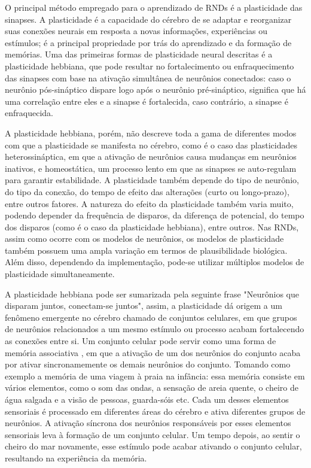 O principal método empregado para o aprendizado de RNDs é a plasticidade das sinapses. A plasticidade é a capacidade do cérebro de
se adaptar e reorganizar suas conexões neurais em resposta a novas informações, experiências ou estímulos; é a principal
propriedade por trás do aprendizado e da formação de memórias. Uma das primeiras formas de plasticidade neural descritas é a
plasticidade hebbiana, que pode resultar no fortalecimento ou enfraquecimento das sinapses com base na ativação simultânea de
neurônios conectados: caso o neurônio pós-sináptico dispare logo após o neurônio pré-sináptico, significa que há uma correlação
entre eles e a sinapse é fortalecida, caso contrário, a sinapse é enfraquecida.

A plasticidade hebbiana, porém, não descreve toda a gama de diferentes modos com que a plasticidade se manifesta no cérebro, como
é o caso das  plasticidades heterossináptica, em que a ativação de neurônios causa mudanças em neurônios inativos, e homeostática,
um processo lento em que as sinapses se auto-regulam para garantir estabilidade. A plasticidade também
depende do tipo de neurônio, do tipo da conexão, do tempo de efeito das alterações (curto ou longo-prazo), entre outros fatores. A
natureza do efeito da plasticidade também varia muito, podendo depender da frequência de disparos, da diferença de potencial, do
tempo dos disparos (como é o caso da plasticidade hebbiana), entre outros. Nas RNDs, assim como ocorre com os modelos de
neurônios, os modelos de plasticidade também possuem uma ampla variação em termos de plausibilidade biológica. Além disso,
dependendo da implementação, pode-se utilizar múltiplos modelos de plasticidade simultaneamente.

A plasticidade hebbiana pode ser sumarizada pela seguinte frase "Neurônios que disparam juntos, conectam-se juntos", assim, a
plasticidade dá origem a um fenômeno emergente no cérebro chamado de conjuntos celulares, em que grupos de neurônios relacionados
a um mesmo estímulo ou processo acabam fortalecendo as conexões entre si. Um conjunto celular pode servir como uma forma de
memória associativa \cite{sakuraiMultipleApproachesInvestigation2018}, em que a ativação de um dos neurônios do conjunto acaba por
ativar sincronamemente os demais neurônios do conjunto. Tomando como exemplo a memória de uma viagem à praia na infância: essa
memória consiste em vários elementos, como o som das ondas, a sensação de areia quente, o cheiro de água salgada e a visão de
pessoas, guarda-sóis etc. Cada um desses elementos sensoriais é processado em diferentes áreas do cérebro e ativa diferentes
grupos de neurônios. A ativação síncrona dos neurônios responsáveis por esses elementos sensoriais leva à formação de um conjunto
celular. Um tempo depois, ao sentir o cheiro do mar novamente, esse estímulo pode acabar ativando o conjunto celular, resultando
na experiência da memória.

